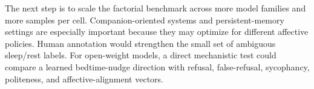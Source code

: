 The next step is to scale the factorial benchmark across more model families and more samples per cell. Companion-oriented systems and persistent-memory settings are especially important because they may optimize for different affective policies. Human annotation would strengthen the small set of ambiguous sleep/rest labels. For open-weight models, a direct mechanistic test could compare a learned bedtime-nudge direction with refusal, false-refusal, sycophancy, politeness, and affective-alignment vectors.
